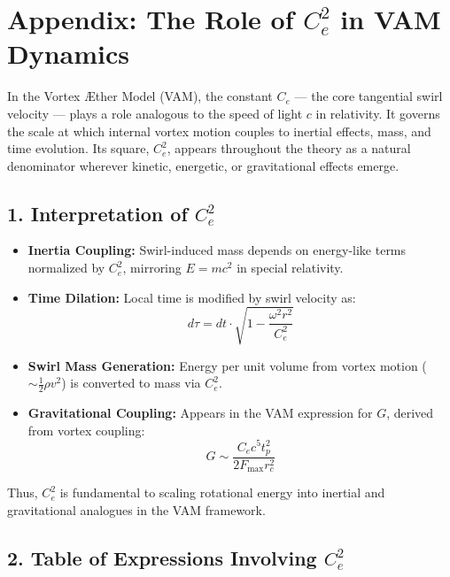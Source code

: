 \documentclass[11pt]{article}
\begin{document}
\section*{Appendix: The Role of \( C_e^2 \) in VAM Dynamics}

In the Vortex \AE{}ther Model (VAM), the constant \( C_e \) --- the core tangential swirl velocity --- plays a role analogous to the speed of light \( c \) in relativity. It governs the scale at which internal vortex motion couples to inertial effects, mass, and time evolution. Its square, \( C_e^2 \), appears throughout the theory as a natural denominator wherever kinetic, energetic, or gravitational effects emerge.

\subsection*{1. Interpretation of \( C_e^2 \)}

\begin{itemize}
    \item \textbf{Inertia Coupling:} Swirl-induced mass depends on energy-like terms normalized by \( C_e^2 \), mirroring \( E = mc^2 \) in special relativity.
    \item \textbf{Time Dilation:} Local time is modified by swirl velocity as:
    \[ d\tau = dt \cdot \sqrt{1 - \frac{\omega^2 r^2}{C_e^2}} \]

    \item \textbf{Swirl Mass Generation:} Energy per unit volume from vortex motion (\( \sim \frac{1}{2} \rho v^2 \)) is converted to mass via \( C_e^2 \).

    \item \textbf{Gravitational Coupling:} Appears in the VAM expression for \( G \), derived from vortex coupling:
    \[ G \sim \frac{C_e c^5 t_p^2}{2 F_{\text{max}} r_c^2} \]
\end{itemize}

Thus, \( C_e^2 \) is fundamental to scaling rotational energy into inertial and gravitational analogues in the VAM framework.

\subsection*{2. Table of Expressions Involving \( C_e^2 \)}
\end{document}
